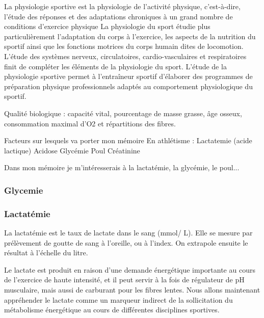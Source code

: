         La physiologie sportive est la physiologie de l'activité physique, c'est-à-dire, l'étude des réponses et des adaptations chroniques à un grand nombre de conditions d'exercice physique
        La physiologie du sport étudie plus particulièrement l’adaptation du corps à l’exercice, les aspects de la nutrition du sportif ainsi que les fonctions motrices du corps humain dites de locomotion. L’étude des systèmes nerveux, circulatoires, cardio-vasculaires et respiratoires finit de compléter les éléments de la physiologie du sport.
L’étude de la physiologie sportive permet à l’entraîneur sportif d’élaborer des programmes de préparation physique professionnels adaptés au comportement physiologique du sportif. 
    
        Qualité biologique : capacité vital, pourcentage de masse grasse, âge osseux, consommation  maximal d’O2 et répartitions des fibres.


            Facteurs sur lesquels va porter mon mémoire 
            En athlétisme :
            Lactatemie (acide lactique)
            Acidose
            Glycémie
            Poul
            Créatinine
            
            
            Dans mon mémoire je m'intéresserais à la lactatémie, la glycémie, le poul...

        \subsubsection{Glycemie}
        \label{subsection:glycemie}
        
        \subsubsection{Lactatémie}
        \label{subsection:lactatemie}
        La lactatémie est le taux de lactate dans le sang (mmol/ L). Elle se mesure par prélèvement de goutte de sang à l'oreille, ou à l'index. On extrapole ensuite le résultat à l'échelle du litre.
        
        Le lactate est produit en raison d’une demande énergétique importante au cours de l’exercice de haute intensité, et il peut servir à la fois de régulateur de pH musculaire, mais aussi de carburant pour les fibres lentes. Nous allons maintenant appréhender le lactate comme un marqueur indirect de la sollicitation du métabolisme énergétique au cours de différentes disciplines sportives.

        \vspace{10pt}
        

